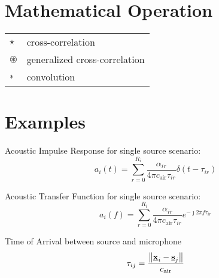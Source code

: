 \section*{Mathematical Operation}
\begin{table}[H]
    \begin{tabular}{ll}
        $\star$         & cross-correlation\\
        $\circledast$   & generalized cross-correlation\\
        $\ast$          & convolution\\
    \end{tabular}
\end{table}

\section*{Examples}

Acoustic Impulse Response for single source scenario:
\begin{equation}
    a_i(t) = \sum_{r=0}^{R_i} \frac{\alpha_{ir}}{4 \pi c_{\text{air}}\tau_{ir}} \delta(t - \tau_{ir})
\end{equation}

Acoustic Transfer Function for single source scenario:
\begin{equation}
    a_i(f) = \sum_{r=0}^{R_i} \frac{\alpha_{ir}}{4 \pi c_{\text{air}}\tau_{ir}} e^{-\jmath 2 \pi f \tau_{ir}}
\end{equation}

Time of Arrival between source and microphone
\begin{equation}
    \tau_{ij} = \frac{\kvvbar{\underline{\mathbf{x}}_i - \underline{\mathbf{s}}_j}}{c_\text{air}}
\end{equation}